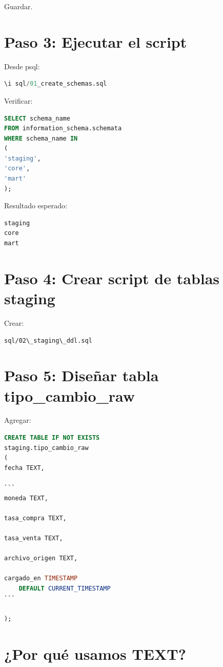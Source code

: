 Guardar.

\section{Paso 3: Ejecutar el script}

Desde psql:

\begin{lstlisting}[language=SQL]
\i sql/01_create_schemas.sql
\end{lstlisting}

Verificar:

\begin{lstlisting}[language=SQL]
SELECT schema_name
FROM information_schema.schemata
WHERE schema_name IN
(
'staging',
'core',
'mart'
);
\end{lstlisting}

Resultado esperado:

\begin{verbatim}
staging
core
mart
\end{verbatim}

\section{Paso 4: Crear script de tablas staging}

Crear:

\begin{verbatim}
sql/02\_staging\_ddl.sql
\end{verbatim}

\section{Paso 5: Diseñar tabla tipo\_cambio\_raw}

Agregar:

\begin{lstlisting}[language=SQL]
CREATE TABLE IF NOT EXISTS
staging.tipo_cambio_raw
(
fecha TEXT,

```
moneda TEXT,

tasa_compra TEXT,

tasa_venta TEXT,

archivo_origen TEXT,

cargado_en TIMESTAMP
    DEFAULT CURRENT_TIMESTAMP
```

);
\end{lstlisting}

\section{¿Por qué usamos TEXT?}


